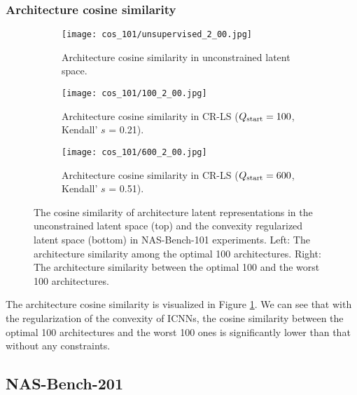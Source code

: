 \documentclass[10pt,twocolumn,letterpaper]{article}
\begin{document}
\subsubsection{Architecture cosine similarity}
\begin{figure}
	\centering
	\begin{subfigure}{1.05 \linewidth}
		\texttt{[image: cos\_101/unsupervised\_2\_00.jpg]}
		\caption{Architecture cosine similarity in unconstrained latent space.}
	\end{subfigure}
	\hfill
	\begin{subfigure}{1.05 \linewidth}
		\texttt{[image: cos\_101/100\_2\_00.jpg]}
		\caption{Architecture cosine similarity in CR-LS ($Q_{\rm start} = 100$, Kendall' $s$ = 0.21).}
	\end{subfigure}
	\begin{subfigure}{1.05 \linewidth}
		\texttt{[image: cos\_101/600\_2\_00.jpg]}
		\caption{Architecture cosine similarity in CR-LS ($Q_{\rm start} = 600$, Kendall' $s$ = 0.51).}
	\end{subfigure}
	\caption{The cosine similarity of architecture latent representations in the unconstrained latent space (top) and the convexity regularized latent space (bottom) in NAS-Bench-101 experiments. Left: The architecture similarity among the optimal 100 architectures. Right: The architecture similarity between the optimal 100 and the worst 100 architectures. }
	\label{fig:cos_101}
\end{figure} 
The architecture cosine similarity is visualized in Figure \ref{fig:cos_101}. We can see that with the regularization of the convexity of ICNNs, the cosine similarity between the optimal 100 architectures and the worst 100 ones is significantly lower than that without any constraints.   
\subsection{NAS-Bench-201} 
\end{document}
